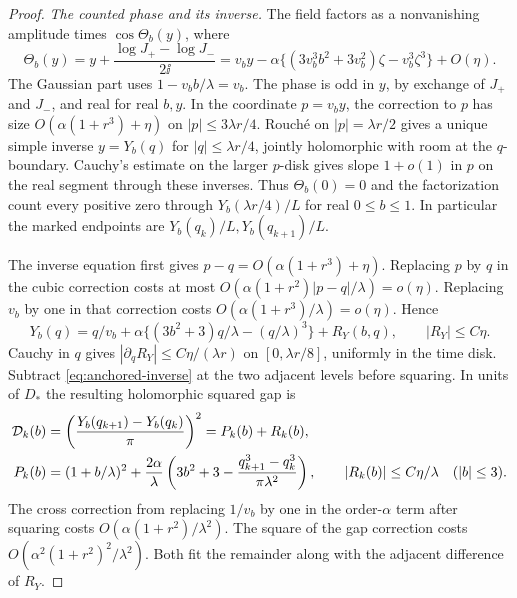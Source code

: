 \begin{proof}
\emph{The counted phase and its inverse.}
The field factors as a nonvanishing amplitude times \(\cos\Theta_b(y)\), where
\begin{equation}\label{eq:anchored-phase}
 \Theta_b(y)=y+\frac{\log J_+-\log J_-}{2\ii}
 =v_b y-\alpha\{(3v_b^3 b^2+3v_b^2)\zeta-v_b^3\zeta^3\}+O(\eta).
\end{equation}
The Gaussian part uses \(1-v_b b/\lambda=v_b\). The phase is odd in
\(y\), by exchange of \(J_+\) and \(J_-\), and real for real \(b,y\).
In the coordinate \(p=v_by\), the correction to \(p\) has size
\(O(\alpha(1+r^3)+\eta)\) on \(|p|\le3\lambda r/4\).
Rouché on \(|p|=\lambda r/2\) gives a unique simple inverse
\(y=Y_b(q)\) for \(|q|\le\lambda r/4\), jointly holomorphic with room at
the \(q\)-boundary. Cauchy's estimate on the larger \(p\)-disk gives
slope \(1+o(1)\) in \(p\) on the real segment through these inverses.
Thus \(\Theta_b(0)=0\) and the factorization count every positive zero
through \(Y_b(\lambda r/4)/L\) for real \(0\le b\le1\). In particular
the marked endpoints are \(Y_b(q_k)/L,Y_b(q_{k+1})/L\).

The inverse equation first gives \(p-q=O(\alpha(1+r^3)+\eta)\).
Replacing \(p\) by \(q\) in the cubic correction costs at most
\(O(\alpha(1+r^2)|p-q|/\lambda)=o(\eta)\). Replacing \(v_b\) by one
in that correction costs \(O(\alpha(1+r^3)/\lambda)=o(\eta)\). Hence
\begin{equation}\label{eq:anchored-inverse}
 Y_b(q)=q/v_b+\alpha\{(3b^2+3)q/\lambda-(q/\lambda)^3\}+R_Y(b,q),
 \qquad |R_Y|\le C\eta .
\end{equation}
Cauchy in \(q\) gives \(|\partial_q R_Y|\le C\eta/(\lambda r)\) on
\([0,\lambda r/8]\), uniformly in the time disk. Subtract
\eqref{eq:anchored-inverse} at the two adjacent levels before squaring.
In units of \(D_*\) the resulting holomorphic squared gap is
\begin{align}
 \mathcal D_k(b)&=\left(\frac{Y_b(q_{k+1})-Y_b(q_k)}{\pi}\right)^2
                   =P_k(b)+R_k(b),\label{eq:anchored-model}\\
 P_k(b)&=(1+b/\lambda)^2+\frac{2\alpha}{\lambda}
      \left(3b^2+3-\frac{q_{k+1}^3-q_k^3}{\pi\lambda^2}\right),
      \qquad |R_k(b)|\le C\eta/\lambda\quad (|b|\le3).\notag
\end{align}
The cross correction from replacing \(1/v_b\) by one in the order-\(\alpha\)
term after squaring costs \(O(\alpha(1+r^2)/\lambda^2)\). The square
of the gap correction costs \(O(\alpha^2(1+r^2)^2/\lambda^2)\).
Both fit the remainder along with the adjacent difference of \(R_Y\).


\end{proof}
